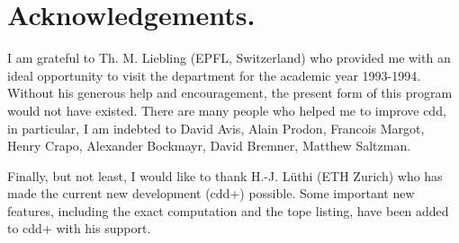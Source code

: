 \documentclass[11pt]{article}
\begin{document}
\section*{Acknowledgements.} 
I am  grateful to Th. M. Liebling (EPFL, Switzerland)  who
provided me with an ideal opportunity to visit the department
for the academic year 1993-1994.  Without his 
generous help and encouragement,
the present form of this program would not have existed.
There are many people who helped me to improve cdd,  in particular,
I am indebted to David Avis, Alain Prodon,  Francois Margot, Henry Crapo,
Alexander Bockmayr, David Bremner, Matthew Saltzman. 

Finally, but not least, I would like to thank H.-J. L\"uthi
(ETH Zurich) who has made the current new development (cdd+)
possible.  Some important new features, including the exact computation
and the tope listing, have been added to cdd+ with his support.




\end{document}
